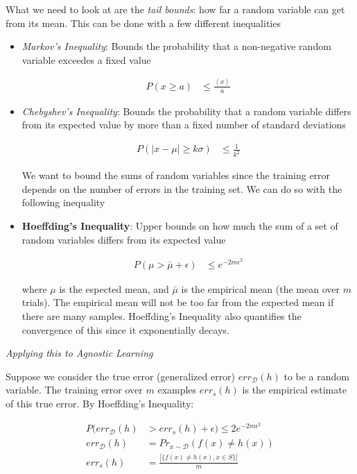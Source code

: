 \documentclass{article}
\newcommand{\abs}[1]{\left| #1\right|}
\renewcommand{\dim}{\mathcal{D}}
\newcommand{\Ex}[1]{\left< #1\right>}
\begin{document}
What we need to look at are the {\em tail bounds}: how far a random variable can get from its mean. This can be done with a few different inequalities

\begin{itemize}
\item {\em Markov's Inequality}: Bounds the probability that a non-negative random variable exceedes a fixed value

\begin{align}
P(x\geq a) &\leq \frac{\Ex{x}}{a}
\end{align}

\item {\em Chebyshev's Inequality}: Bounds the probability that a random variable differs from its expected value by more than a fixed number of standard deviations

\begin{align}
P(\abs{x-\mu}\geq k\sigma) &\leq \frac{1}{k^{2}}
\end{align}

We want to bound the sums of random variables since the training error depends on the number of errors in the training set. We can do so with the following inequality

\item {\bf Hoeffding's Inequality}: Upper bounds on how much the sum of a set of random variables differs from its expected value

\begin{align}
P(\mu>\bar{\mu}+\epsilon) &\leq e^{-2m\epsilon^{2}}
\end{align}

where $\mu$ is the espected mean, and $\bar{\mu}$ is the empirical mean (the mean over $m$ trials). The empirical mean will not be too far from the expected mean if there are many samples. Hoeffding's Inequality also quantifies the convergence of this since it exponentially decays.
\end{itemize}

{\em Applying this to Agnostic Learning}

Suppose we consider the true error (generalized error) $err_{\dim}(h)$ to be a random variable. The training error over $m$ examples $err_{s}(h)$ is the empirical estimate of this true error. By Hoeffding's Inequality:

\begin{align}
P(err_{\dim}(h) &> err_{s}(h) + \epsilon) \leq 2e^{-2m\epsilon^{2}}\\
err_{\dim}(h) &= Pr_{x\sim\dim}(f(x)\neq h(x))\\
err_{s}(h) &= \frac{\abs{\{f(x)\neq h(x),x\in S\}}}{m}
\end{align}
\end{document}
